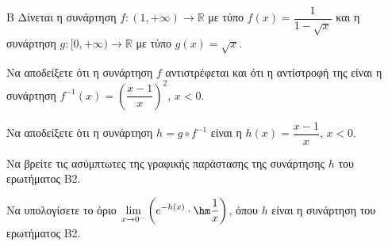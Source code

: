 \begin{thema}{Β}
Δίνεται η συνάρτηση $f: (1, +\infty) \to \mathbb{R}$ με τύπο $f(x) = \dfrac{1}{1 - \sqrt{x}}$ και η συνάρτηση $g: [0, +\infty) \to \mathbb{R}$ με τύπο $g(x) = \sqrt{x}$.
\begin{erwthma}
    \item Να αποδείξετε ότι η συνάρτηση $f$ αντιστρέφεται και ότι η αντίστροφή της είναι η συνάρτηση $f^{-1}(x) = \left(\dfrac{x-1}{x}\right)^2$, $x < 0$. 

    \item Να αποδείξετε ότι η συνάρτηση $h = g \circ f^{-1}$ είναι η $h(x) = \dfrac{x-1}{x}$, $x < 0$. 

    \item Να βρείτε τις ασύμπτωτες της γραφικής παράστασης της συνάρτησης $h$ του ερωτήματος Β2. 

    \item Να υπολογίσετε το όριο $\displaystyle\lim_{x \to 0^-}\left(e^{-h(x)} \cdot \hm\frac{1}{x}\right)$, όπου $h$ είναι η συνάρτηση του ερωτήματος Β2. 
\end{erwthma}
\end{thema}

